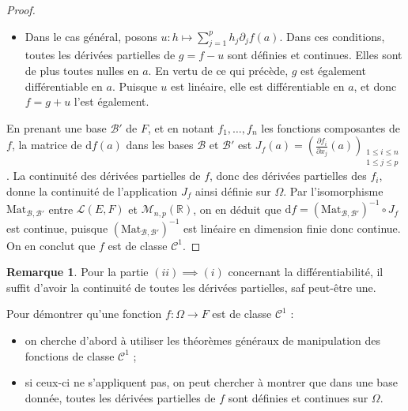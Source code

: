 \documentclass[french]{article}
\newcommand{\R}{\mathbb{R}}
\newcommand{\inv}{^{-1}}
\renewcommand{\o}{\text{o}}
\renewcommand{\d}{\text{d}}
\theoremstyle{plain}
\theoremstyle{definition}
\newtheorem*{rmq}{Remarque}
\theoremstyle{remark}
\begin{document}
\begin{proof}
\begin{itemize}
		$$\lVert f(s_k)-f(s_{k-1})\rVert=\lVert g_k(1)-g_k(0)\rVert\leqslant\lVert h\rVert\frac{\varepsilon}{p}.$$
		Il s'ensuit que :
		\begin{align*}
			\lVert f(a+h)-f(a)\rVert&=\left\lVert\sum_{k=1}^{p}(f(s_k)-f(s_{k-1}))\right\rVert\\
			&\leqslant\sum_{k=1}^{p}\lVert f(s_k)-f(s_{k-1})\rVert\\
			&\leqslant\sum_{k=1}^{p}\lVert h\rVert\frac{\varepsilon}{p}\\
			&=\lVert h\rVert\varepsilon
		\end{align*}
		Par suite, $f(a+h)=f(a)+\o(h)$ au voisinage de $0$ et donc $f$ est différentiable et $\d f(a)=0$.
		\item Dans le cas général, posons $u:h\mapsto\displaystyle\sum_{j=1}^{p}h_j\partial_jf(a)$. Dans ces conditions, toutes les dérivées partielles de $g=f-u$ sont définies et continues. Elles sont de plus toutes nulles en $a$. En vertu de ce qui précède, $g$ est également différentiable en $a$. Puisque $u$ est linéaire, elle est différentiable en $a$, et donc $f=g+u$ l'est également.
	\end{itemize}
	En prenant une base $\mathcal{B}'$ de $F$, et en notant $f_1,\ldots,f_n$ les fonctions composantes de $f$, la matrice de $\d f(a)$ dans les bases $\mathcal{B}$ et $\mathcal{B}'$ est $J_f(a)=\displaystyle\left(\frac{\partial f_i}{\partial x_j}(a)\right)_{\substack{1\leqslant i\leqslant n\\ 1\leqslant j\leqslant p}}$. La continuité des dérivées partielles de $f$, donc des dérivées partielles des $f_i$, donne la continuité de l'application $J_f$ ainsi définie sur $\Omega$. Par l'isomorphisme $\text{Mat}_{\mathcal{B},\mathcal{B}'}$ entre $\mathcal{L}(E,F)$ et $\mathcal{M}_{n,p}(\R)$, on en déduit que $\d f=(\text{Mat}_{\mathcal{B},\mathcal{B}'})\inv\circ J_f$ est continue, puisque $\left(\text{Mat}_{\mathcal{B},\mathcal{B}'}\right)\inv$ est linéaire en dimension finie donc continue. \\
	On en conclut que $f$ est de classe $\mathcal{C}^1$.
\end{proof}

\begin{rmq}
	Pour la partie $(ii)\implies (i)$ concernant la différentiabilité, il suffit d'avoir la continuité de toutes les dérivées partielles, saf peut-être une.
\end{rmq}

\begin{met}
	Pour démontrer qu'une fonction $f:\Omega\to F$ est de classe $\mathcal{C}^1$ :
	\begin{itemize}
		\item on cherche d'abord à utiliser les théorèmes généraux de manipulation des fonctions de classe $\mathcal{C}^1$ ;
		\item si ceux-ci ne s'appliquent pas, on peut chercher à montrer que dans une base donnée, toutes les dérivées partielles de $f$ sont définies et continues sur $\Omega$.
	\end{itemize}
\end{met}
\end{document}
